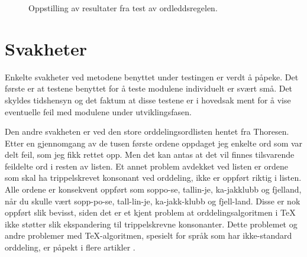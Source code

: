 
\begin{figure}[h]
\centering

    \caption[Resultater fra test av ordleddsregelen]{Oppstilling av resultater fra test av ordleddsregelen.}
    \label{fig:ordleddsregelen}
\end{figure}

\section{Svakheter}

Enkelte svakheter ved metodene benyttet under testingen er verdt å påpeke. Det første er at testene benyttet for å teste modulene individuelt er svært små. Det skyldes tidshensyn og det faktum at disse testene er i hovedsak ment for å vise eventuelle feil med modulene under utviklingsfasen. 

Den andre svakheten er ved den store orddelingsordlisten hentet fra Thoresen. Etter en gjennomgang av de tusen første ordene oppdaget jeg enkelte ord som var delt feil, som jeg fikk rettet opp. Men det kan antas at det vil finnes tilsvarende feildelte ord i resten av listen. Et annet problem avdekket ved listen er ordene som skal ha trippelskrevet konsonant ved orddeling, ikke er oppført riktig i listen. Alle ordene er konsekvent oppført som soppo-se, tallin-je, ka-jakklubb og fjelland, når du skulle vært sopp-po-se, tall-lin-je, ka-jakk-klubb og fjell-land. Disse er nok oppført slik bevisst, siden det er et kjent problem at orddelingsalgoritmen i \TeX{} ikke støtter slik ekspandering til trippelskrevne konsonanter. Dette problemet og andre problemer med \TeX{}-algoritmen, spesielt for språk som har ikke-standard orddeling, er påpekt i flere artikler \cite{sojka1995hyphenation,sojka1995notes,nemeth2006automatic,omega}.

